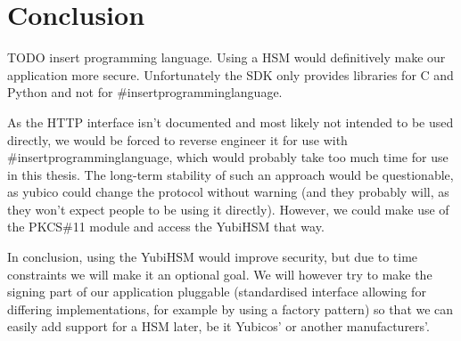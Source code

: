 \section{Conclusion}\label{sec:conclusion}
TODO insert programming language.
Using a \gls{HSM} would definitively make our application more secure.
Unfortunately the \gls{SDK} only provides libraries for C and Python and not for \#insertprogramminglanguage.

As the \gls{HTTP} interface isn't documented and most likely not intended to be used directly,
we would be forced to reverse engineer it for use with \#insertprogramminglanguage,
which would probably take too much time for use in this thesis.
The long-term stability of such an approach would be questionable,
as yubico could change the protocol without warning (and they probably will, as they won't expect people to be using it directly).
However, we could make use of the \gls{PKCS}\#11 module and access the YubiHSM that way.

In conclusion, using the YubiHSM would improve security, but due to time constraints we will make it an optional goal.
We will however try to make the signing part of our application pluggable (standardised interface allowing for differing implementations,
for example by using a factory pattern) so that we can easily add support for a \gls{HSM} later,
be it Yubicos' or another manufacturers'.
